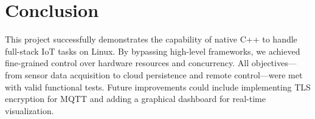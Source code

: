 \documentclass[12pt, a4paper]{article}
\begin{document}
\newpage

\section{Conclusion}
This project successfully demonstrates the capability of native C++ to handle full-stack IoT tasks on Linux. By bypassing high-level frameworks, we achieved fine-grained control over hardware resources and concurrency. All objectives—from sensor data acquisition to cloud persistence and remote control—were met with valid functional tests. Future improvements could include implementing TLS encryption for MQTT and adding a graphical dashboard for real-time visualization.
\end{document}
